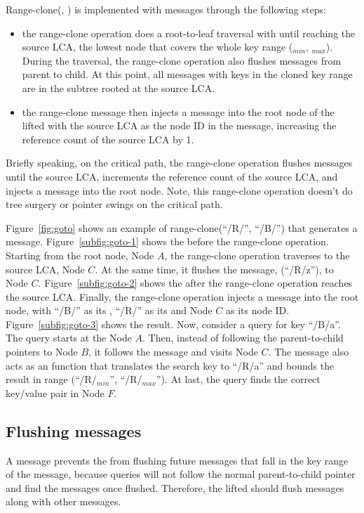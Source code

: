 Range-clone(\spre, \dpre) is implemented with \goto messages through the
following steps:
\begin{itemize}
\item the range-clone operation does a root-to-leaf traversal with \spre
until reaching the source LCA, the lowest node that covers the whole key range
(\spre$_{min}$, \spre$_{max}$).
During the traversal, the range-clone operation also flushes messages from
parent to child.
At this point, all messages with keys in the cloned key range
are in the subtree rooted at the source LCA.
\item the range-clone message then injects a \goto message into the root node of
the lifted \bedag with the source LCA as the node ID in the \goto message,
increasing the reference count of the source LCA by 1.
\end{itemize}
Briefly speaking, on the critical path, the range-clone operation flushes
messages until the source LCA, increments the reference count of the source LCA,
and injects a \goto message into the root node.
Note, this range-clone operation doesn't do tree surgery or pointer swings
on the critical path.

Figure~\ref{fig:goto} shows an example of range-clone(``/R/'', ``/B/'')
that generates a \goto message.
Figure~\ref{subfig:goto-1} shows the \bet before the range-clone operation.
Starting from the root node, Node $A$, the range-clone operation traverses to
the source LCA, Node $C$.
At the same time, it flushes the message, \delm(``/R/z''), to Node $C$.
Figure~\ref{subfig:goto-2} shows the \bet after the range-clone operation
reaches the source LCA.
Finally, the range-clone operation injects a \goto message into the root node,
with ``/B/'' as its \dpre, ``/R/'' as its \spre and Node $C$ as its node ID.
Figure~\ref{subfig:goto-3} shows the result.
Now, consider a query for key ``/B/a''.
The query starts at the Node $A$.
Then, instead of following the parent-to-child pointers to Node $B$, it follows
the \goto message and visits Node $C$.
The \goto message also acts as an \xf function that translates the search key
to ``/R/a'' and bounds the result in range (``/R/$_{min}$'', ``/R/$_{max}$'').
At last, the query finds the correct key/value pair in Node $F$.

\subsection{Flushing \goto messages}
\label{sec:rc:flush}

A \goto message prevents the \bet from flushing future messages that
fall in the key range of the \goto message,
because queries will not follow the normal parent-to-child pointer and find
the messages once flushed.
Therefore, the lifted \bedag should flush \goto messages along with other messages.

